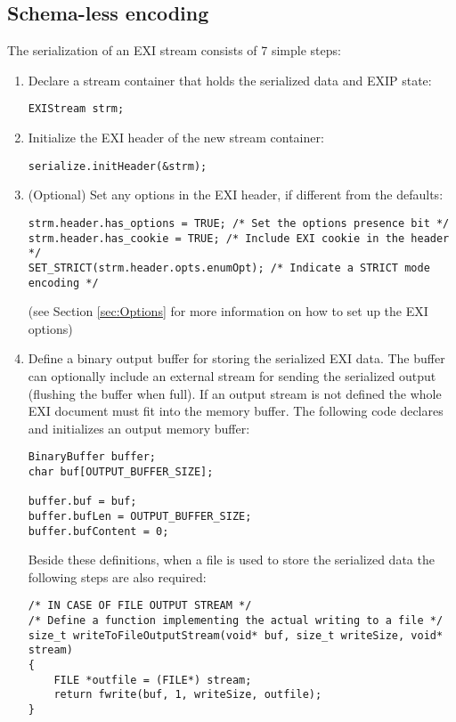 \subsection{Schema-less encoding}
The serialization of an EXI stream consists of 7 simple steps:
\begin{enumerate}
 \item Declare a stream container that holds the serialized data and EXIP state:
\begin{lstlisting}
EXIStream strm;
\end{lstlisting}

 \item Initialize the EXI header of the new stream container:
\begin{lstlisting}
serialize.initHeader(&strm);                                                            
\end{lstlisting}

 \item \label{item:step-options} (Optional) Set any options in the EXI header, if different from the defaults:
\begin{lstlisting}
strm.header.has_options = TRUE; /* Set the options presence bit */ 
strm.header.has_cookie = TRUE; /* Include EXI cookie in the header */
SET_STRICT(strm.header.opts.enumOpt); /* Indicate a STRICT mode encoding */
\end{lstlisting}
(see Section \ref{sec:Options} for more information on how to set up
the EXI options)

 \item Define a binary output buffer for storing the serialized EXI data.
The buffer can optionally include an external stream for sending the
serialized output (flushing the buffer when full). If an output stream
is not defined the whole EXI document must fit into the memory buffer.
The following code declares and initializes an output memory buffer:
\begin{lstlisting}
BinaryBuffer buffer;
char buf[OUTPUT_BUFFER_SIZE];

buffer.buf = buf;
buffer.bufLen = OUTPUT_BUFFER_SIZE;
buffer.bufContent = 0;
\end{lstlisting}
Beside these definitions, when a file is used to store the
serialized data the following steps are also required: 
\begin{lstlisting}
/* IN CASE OF FILE OUTPUT STREAM */
/* Define a function implementing the actual writing to a file */
size_t writeToFileOutputStream(void* buf, size_t writeSize, void* stream)
{
	FILE *outfile = (FILE*) stream;
	return fwrite(buf, 1, writeSize, outfile);
}


\end{lstlisting}
\end{enumerate}

